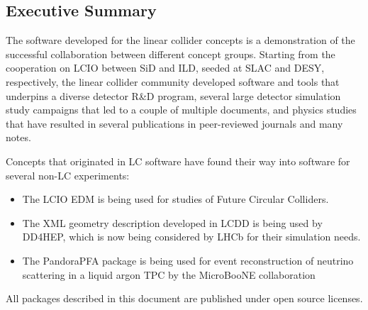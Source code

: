 \subsection{Executive Summary}

The software developed for the linear collider concepts is a demonstration of the successful collaboration between different concept groups. Starting from the cooperation on LCIO between SiD and ILD, seeded at SLAC and DESY, respectively, the linear collider community developed software and tools that underpins a diverse detector R\&D program, several large detector simulation study campaigns that led to a couple of multiple documents, and physics studies that have resulted in several publications in peer-reviewed journals and many notes.

Concepts that originated in LC software have found their way into software for several non-LC experiments:
\begin{itemize}
 	\item The LCIO EDM is being used for studies of Future Circular Colliders.
	\item The XML geometry description developed in LCDD is being used by DD4HEP, which is now being considered by LHCb for their simulation needs.
	\item The PandoraPFA package is being used for event reconstruction of neutrino scattering in a liquid argon TPC by the MicroBooNE collaboration
\end{itemize}

All packages described in this document are published under open source licenses.
